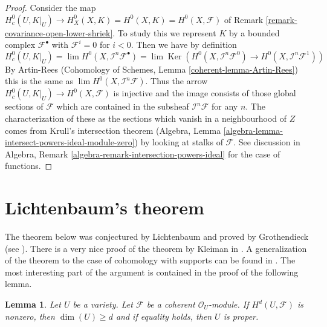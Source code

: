 \documentclass{stacks-project}
\theoremstyle{plain}
\newtheorem{lemma}[subsection]{Lemma}
\theoremstyle{definition}
\theoremstyle{remark}
\numberwithin{equation}{subsection}
\def\lim{\mathop{\mathrm{lim}}\nolimits}
\def\Ker{\mathop{\mathrm{Ker}}}
\begin{document}
\begin{proof}
Consider the map
$H^0_c(U, K|_U) \to H^0_X(X, K) = H^0(X, K) = H^0(X, \mathcal{F})$ of
Remark \ref{remark-covariance-open-lower-shriek}. To study this
we represent $K$ by a bounded complex $\mathcal{F}^\bullet$ with
$\mathcal{F}^i = 0$ for $i < 0$. Then we have by definition
$$
H^0_c(U, K|_U) = \lim H^0(X, \mathcal{I}^n\mathcal{F}^\bullet)
= \lim \Ker(
H^0(X, \mathcal{I}^n\mathcal{F}^0) \to
H^0(X, \mathcal{I}^n\mathcal{F}^1))
$$
By Artin-Rees (Cohomology of Schemes, Lemma \ref{coherent-lemma-Artin-Rees})
this is the same as $\lim H^0(X, \mathcal{I}^n\mathcal{F})$.
Thus the arrow $H^0_c(U, K|_U) \to H^0(X, \mathcal{F})$
is injective and the image consists of those global sections of $\mathcal{F}$
which are contained in the subsheaf $\mathcal{I}^n\mathcal{F}$
for any $n$. The characterization of these as the sections which
vanish in a neighbourhood of $Z$ comes from Krull's intersection
theorem (Algebra, Lemma \ref{algebra-lemma-intersect-powers-ideal-module-zero})
by looking at stalks of $\mathcal{F}$. See discussion in
Algebra, Remark \ref{algebra-remark-intersection-powers-ideal}
for the case of functions.
\end{proof}




\section{Lichtenbaum's theorem}
\label{section-lichtenbaum}

\noindent
The theorem below was conjectured by Lichtenbaum and proved by Grothendieck
(see \cite{Hartshorne-local-cohomology}). There is a very nice proof of the
theorem by Kleiman in \cite{Kleiman-Lichtenbaum}. A generalization of
the theorem to the case of cohomology with supports can be found in
\cite{Lyubeznik-Lichtenbaum}. The most interesting part of the argument
is contained in the proof of the following lemma.

\begin{lemma}
\label{lemma-lichtenbaum}
Let $U$ be a variety. Let $\mathcal{F}$ be a coherent $\mathcal{O}_U$-module.
If $H^d(U, \mathcal{F})$ is nonzero, then $\dim(U) \geq d$ and if
equality holds, then $U$ is proper.
\end{lemma}
\end{document}
